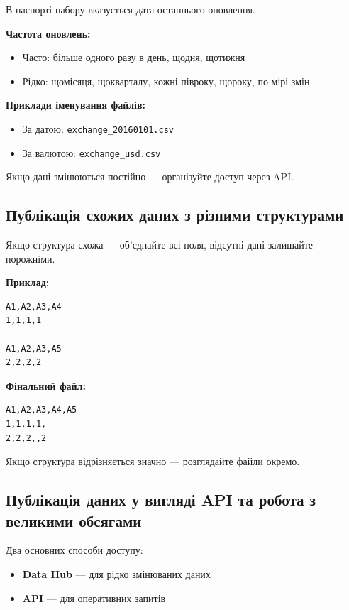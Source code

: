 В паспорті набору вказується дата останнього оновлення.

\textbf{Частота оновлень:}

\begin{itemize}
    \item Часто: більше одного разу в день, щодня, щотижня
    \item Рідко: щомісяця, щокварталу, кожні півроку, щороку, по мірі змін
\end{itemize}

\textbf{Приклади іменування файлів:}

\begin{itemize}
    \item За датою: \texttt{exchange\_20160101.csv}
    \item За валютою: \texttt{exchange\_usd.csv}
\end{itemize}

Якщо дані змінюються постійно — організуйте доступ через API.

\subsection{Публікація схожих даних з різними структурами}

Якщо структура схожа — об'єднайте всі поля, відсутні дані залишайте порожніми.

\textbf{Приклад:}

\begin{verbatim}
A1,A2,A3,A4
1,1,1,1

A1,A2,A3,A5
2,2,2,2
\end{verbatim}

\textbf{Фінальний файл:}

\begin{verbatim}
A1,A2,A3,A4,A5
1,1,1,1,
2,2,2,,2
\end{verbatim}

Якщо структура відрізняється значно — розглядайте файли окремо.

\subsection{Публікація даних у вигляді API та робота з великими обсягами}

Два основних способи доступу:

\begin{itemize}
    \item \textbf{Data Hub} — для рідко змінюваних даних
    \item \textbf{API} — для оперативних запитів
\end{itemize}

